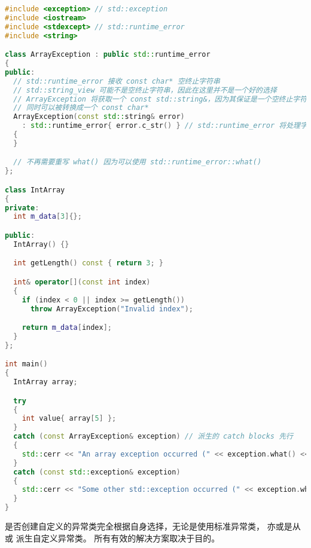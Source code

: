 \documentclass[../../LearnCpp.tex]{subfiles}
\begin{document}
\begin{lstlisting}[language=C++]
#include <exception> // std::exception
#include <iostream>
#include <stdexcept> // std::runtime_error
#include <string>

class ArrayException : public std::runtime_error
{
public:
  // std::runtime_error 接收 const char* 空终止字符串
  // std::string_view 可能不是空终止字符串，因此在这里并不是一个好的选择
  // ArrayException 将获取一个 const std::string&，因为其保证是一个空终止字符串，
  // 同时可以被转换成一个 const char*
  ArrayException(const std::string& error)
    : std::runtime_error{ error.c_str() } // std::runtime_error 将处理字符串
  {
  }

  // 不再需要重写 what() 因为可以使用 std::runtime_error::what()
};

class IntArray
{
private:
  int m_data[3]{};

public:
  IntArray() {}

  int getLength() const { return 3; }

  int& operator[](const int index)
  {
    if (index < 0 || index >= getLength())
      throw ArrayException("Invalid index");

    return m_data[index];
  }
};

int main()
{
  IntArray array;

  try
  {
    int value{ array[5] };
  }
  catch (const ArrayException& exception) // 派生的 catch blocks 先行
  {
    std::cerr << "An array exception occurred (" << exception.what() << ")\n";
  }
  catch (const std::exception& exception)
  {
    std::cerr << "Some other std::exception occurred (" << exception.what() << ")\n";
  }
}
\end{lstlisting}

是否创建自定义的异常类完全根据自身选择，无论是使用标准异常类，
亦或是从  或  派生自定义异常类。
所有有效的解决方案取决于目的。
\end{document}
